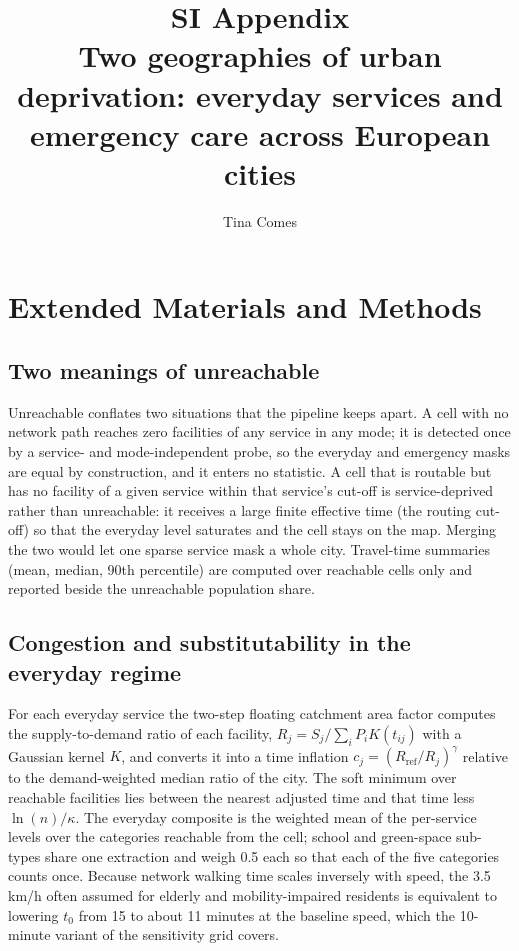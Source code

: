 \documentclass[11pt]{article}
\title{\textbf{SI Appendix}\\[4pt]\large Two geographies of urban deprivation:
everyday services and emergency care across European cities}
\author{Tina Comes}
\date{}
\begin{document}
\maketitle
\tableofcontents
\clearpage

\section{Extended Materials and Methods}\label{si:methods}

\subsection{Two meanings of unreachable}
Unreachable conflates two situations that the pipeline keeps apart. A
cell with no network path reaches zero facilities of any service in any
mode; it is detected once by a service- and mode-independent probe, so the
everyday and emergency masks are equal by construction, and it enters no
statistic. A cell that is routable but has no facility of a given service
within that service's cut-off is service-deprived rather than unreachable:
it receives a large finite effective time (the routing cut-off) so that
the everyday level saturates and the cell stays on the map. Merging the
two would let one sparse service mask a whole city. Travel-time summaries
(mean, median, 90th percentile) are computed over reachable cells only and
reported beside the unreachable population share.

\subsection{Congestion and substitutability in the everyday regime}
For each everyday service the two-step floating catchment area factor
computes the supply-to-demand ratio of each facility,
$R_j = S_j / \sum_i P_i K(t_{ij})$ with a Gaussian kernel $K$, and
converts it into a time inflation $c_j = (R_{\mathrm{ref}}/R_j)^{\gamma}$
relative to the demand-weighted median ratio of the city. The soft
minimum over reachable facilities lies between the nearest adjusted time
and that time less $\ln(n)/\kappa$. The everyday composite is the
weighted mean of the per-service levels over the categories reachable
from the cell; school and green-space sub-types share one extraction and
weigh 0.5 each so that each of the five categories counts once. Because
network walking time scales inversely with speed, the 3.5\,km/h often
assumed for elderly and mobility-impaired residents is equivalent to
lowering $t_0$ from 15 to about 11 minutes at the baseline speed, which
the 10-minute variant of the sensitivity grid covers.
\end{document}
